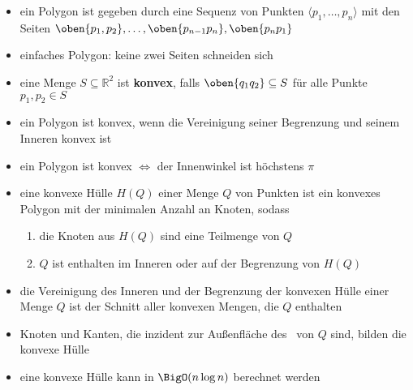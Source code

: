 \begin{itemize}[itemsep=0pt]
	\item ein Polygon ist gegeben durch eine Sequenz von Punkten $\langle p_1,\dots,p_n\rangle$ mit den Seiten $\oben{p_1,p_2},\dots,\oben{p_{n-1}p_n},\oben{p_np_1}$
	\item einfaches Polygon: keine zwei Seiten schneiden sich 
	\item eine Menge $S\subseteq \mathbb{R}^2$ ist \textbf{konvex}, falls $\oben{q_1q_2} \subseteq S$ für alle Punkte $p_1,p_2 \in S$
	\item ein Polygon ist konvex, wenn die Vereinigung seiner Begrenzung und seinem Inneren konvex ist
	\item ein Polygon ist konvex $\Longleftrightarrow$ der Innenwinkel ist höchstens $\pi$
	\item eine konvexe Hülle $H(Q)$ einer Menge $Q$ von Punkten ist ein konvexes Polygon mit der minimalen Anzahl an Knoten, sodass
		\begin{enumerate}
			\item die Knoten aus $H(Q)$ sind eine Teilmenge von $Q$
			\item $Q$ ist enthalten im Inneren oder auf der Begrenzung von $H(Q)$
		\end{enumerate}
	\item die Vereinigung des Inneren und der Begrenzung der konvexen Hülle einer Menge $Q$ ist der Schnitt aller konvexen Mengen, die $Q$ enthalten
	\item Knoten und Kanten, die inzident zur Außenfläche des \dg~von $Q$ sind, bilden die konvexe Hülle
	\item eine konvexe Hülle kann in $\BigO(n\log n)$ berechnet werden
\end{itemize}




